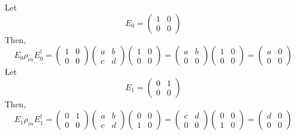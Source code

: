 Let 
\begin{equation}
    E_0 = \begin{pmatrix}1 & 0 \\ 0 & 0\end{pmatrix}
\end{equation}
Then,
\begin{equation}
    E_0 \rho_{in} E_{0}^\dagger = \begin{pmatrix}1 & 0 \\ 0 & 0\end{pmatrix}  \begin{pmatrix}a & b \\ c & d\end{pmatrix} \begin{pmatrix}1 & 0 \\ 0 & 0\end{pmatrix}  = \begin{pmatrix}a & b \\ 0 & 0\end{pmatrix} \begin{pmatrix}1 & 0 \\ 0 & 0\end{pmatrix} = \begin{pmatrix}a  & 0 \\ 0 & 0\end{pmatrix}
\end{equation}
Let 
\begin{equation}
    E_1 = \begin{pmatrix}0 & 1 \\ 0 & 0\end{pmatrix}
\end{equation}
Then,
\begin{equation}
    E_1 \rho_{in} E_1^\dagger = \begin{pmatrix}0 & 1 \\ 0 & 0\end{pmatrix}  \begin{pmatrix}a & b \\ c & d\end{pmatrix} \begin{pmatrix}0 & 0 \\ 1 & 0\end{pmatrix}  = \begin{pmatrix}c & d \\ 0 & 0\end{pmatrix} \begin{pmatrix}0 & 0 \\ 1 & 0\end{pmatrix} = \begin{pmatrix}d  & 0 \\ 0 & 0\end{pmatrix}
\end{equation}
